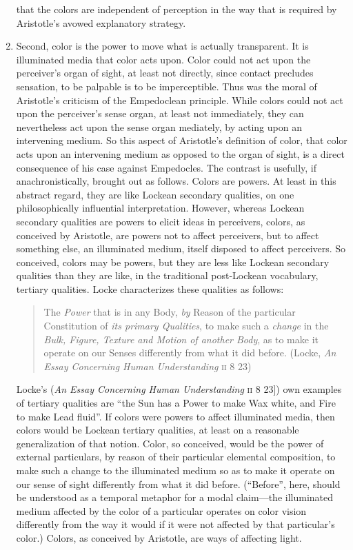 \begin{enumerate}[(1)]
that the colors are independent of perception in the way that is required by Aristotle's avowed explanatory strategy.
	\item Second, color is the power to move what is actually transparent. It is illuminated media that color acts upon. Color could not act upon the perceiver's organ of sight, at least not directly, since contact precludes sensation, to be palpable is to be imperceptible. Thus was the moral of Aristotle's criticism of the Empedoclean principle. While colors could not act upon the perceiver's sense organ, at least not immediately, they can nevertheless act upon the sense organ mediately, by acting upon an intervening medium. So this aspect of Aristotle's definition of color, that color acts upon an intervening medium as opposed to the organ of sight, is a direct consequence of his case against Empedocles. The contrast is usefully, if anachronistically, brought out as follows. Colors are powers. At least in this abstract regard, they are like Lockean secondary qualities, on one philosophically influential interpretation. However, whereas Lockean secondary qualities are powers to elicit ideas in perceivers, colors, as conceived by Aristotle, are powers not to affect perceivers, but to affect something else, an illuminated medium, itself disposed to affect perceivers. So conceived, colors may be powers, but they are less like Lockean secondary qualities than they are like, in the traditional post-Lockean vocabulary, tertiary qualities. Locke characterizes these qualities as follows: 
\begin{quote}
	The \emph{Power} that is in any Body, \emph{by} Reason of the particular Constitution of \emph{its primary Qualities}, to make such a \emph{change} in the \emph{Bulk, Figure, Texture and Motion of another Body}, as to make it operate on our Senses differently from what it did before. (Locke, \emph{An Essay Concerning Human Understanding} \textsc{ii} 8 23)
\end{quote}
Locke's (\emph{An Essay Concerning Human Understanding} \textsc{ii} 8 23]) own examples of tertiary qualities are ``the Sun has a Power to make Wax white, and Fire to make Lead fluid''. If colors were powers to affect illuminated media, then colors would be Lockean tertiary qualities, at least on a reasonable generalization of that notion. Color, so conceived, would be the power of external particulars, by reason of their particular elemental composition, to make such a change to the illuminated medium so as to make it operate on our sense of sight differently from what it did before. (``Before'', here, should be understood as a temporal metaphor for a modal claim---the illuminated medium affected by the color of a particular operates on color vision differently from the way it would if it were not affected by that particular's color.) Colors, as conceived by Aristotle, are ways of affecting light.

\end{enumerate}

